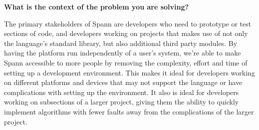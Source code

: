 \documentclass{article}
\begin{document}
\large
\textbf{What is the context of the problem you are solving?}\\
\normalsize

The primary stakeholders of Spann are developers who need to prototype or test
sections of code, and developers working on projects that makes use of not only
the language's standard library, but also additional third party modules. By
having the platform run independently of a user’s system, we’re able to make
Spann accessible to more people by removing the complexity, effort and time of
setting up a development environment. This makes it ideal for developers
working on different platforms and devices that may not support the language or
have complications with setting up the environment. It also is ideal for
developers working on subsections of a larger project, giving them the ability
to quickly implement algorithms with fewer faults away from the complications
of the larger project.\\
\end{document}

